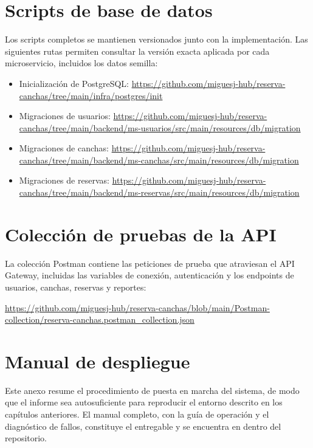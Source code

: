 
\section{Scripts de base de datos}
\label{anexo:sql}

Los scripts completos se mantienen versionados junto con la implementación.
Las siguientes rutas permiten consultar la versión exacta aplicada por cada
microservicio, incluidos los datos semilla:

\begin{itemize}
  \item Inicialización de PostgreSQL:
  \url{https://github.com/miguesj-hub/reserva-canchas/tree/main/infra/postgres/init}
  \item Migraciones de usuarios:
  \url{https://github.com/miguesj-hub/reserva-canchas/tree/main/backend/ms-usuarios/src/main/resources/db/migration}
  \item Migraciones de canchas:
  \url{https://github.com/miguesj-hub/reserva-canchas/tree/main/backend/ms-canchas/src/main/resources/db/migration}
  \item Migraciones de reservas:
  \url{https://github.com/miguesj-hub/reserva-canchas/tree/main/backend/ms-reservas/src/main/resources/db/migration}
\end{itemize}

\section{Colección de pruebas de la API}
\label{anexo:api}

La colección Postman contiene las peticiones de prueba que atraviesan el API
Gateway, incluidas las variables de conexión, autenticación y los endpoints
de usuarios, canchas, reservas y reportes:

\url{https://github.com/miguesj-hub/reserva-canchas/blob/main/Postman-collection/reserva-canchas.postman_collection.json}

\section{Manual de despliegue}
\label{anexo:despliegue}

Este anexo resume el procedimiento de puesta en marcha del sistema, de modo que
el informe sea autosuficiente para reproducir el entorno descrito en los
capítulos anteriores. El manual completo, con la guía de operación y el
diagnóstico de fallos, constituye el entregable  y se encuentra en
 dentro del repositorio.

